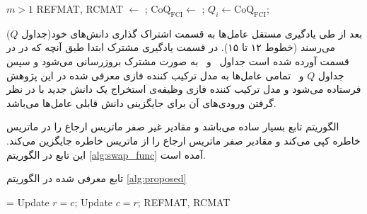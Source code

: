 \begin{algorithm}[t]
\caption{}\label{alg:proposed}
\begin{latin}
\begin{algorithmic}[1]
\Require $m > 1$ 
		\State REFMAT, RCMAT $\gets$ ;
		\State $\text{CoQ}_{\text{FCI}} \gets$ ;
			\State $Q_i \gets \text{CoQ}_{\text{FCI}}$; \label{alg:proposed:QCO_replacement}
		\EndFor
	\EndIf
\EndWhile 
\EndProcedure
\end{algorithmic}
\end{latin}
\end{algorithm}

بعد از طی یادگیری مستقل عامل‌ها به قسمت اشتراک گذاری دانش‌های خود(جداول $Q$) می‌رسند (خطوط ۱۲ تا ۱۵). در قسمت یادگیری مشترک ابتدا طبق آنچه که در در قسمت آورده شده است جداول \ و \ به صورت مشترک بروزرسانی می‌شود و سپس جداول $Q$ و \ تمامی عامل‌ها به مدل ترکیب کننده فازی معرفی شده در این پژوهش فرستاده می‌شود و مدل ترکیب کننده فازی وظیفه‌ی استخراج یک دانش جدید با در نظر گرفتن ورودی‌های آن برای جایگزینی دانش قابلی عامل‌ها می‌باشد.

الگوریتم تابع بسیار ساده می‌باشد و مقادیر غیر صفر ماتریس ارجاع را در ماتریس خاطره کپی می‌کند و مقادیر صفر ماتریس ارجاع را از ماتریس خاطره جایگزین می‌کند. این تابع در الگوریتم
\ref{alg:swap_func}
آمده است.

\begin{algorithm}[t]
\caption{تابع  معرفی شده در الگوریتم \ref{alg:proposed}}\label{alg:swap_func}
\begin{latin}
\begin{algorithmic}[1]
\Require {} = 
			\State Update $r = c$;
		\Else
			\State Update $c = r$;
		\EndIf
	\EndFor
	\State \Return REFMAT, RCMAT
\EndProcedure
\end{algorithmic}
\end{latin}
\end{algorithm}

